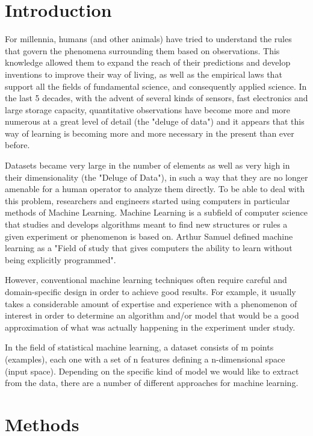 
\section{Introduction}
For millennia, humans (and other animals) have tried to understand the rules that govern the phenomena surrounding them based on observations. This knowledge allowed them to expand the reach of their predictions and develop inventions to improve their way of living, as well as the empirical laws that support all the fields of fundamental science, and consequently applied science. In the last 5 decades, with the advent of several kinds of sensors, fast electronics and large storage capacity, quantitative observations have become more and more numerous at a great level of detail (the "deluge of data") and it appears that this way of learning is becoming more and more necessary in the present than ever before.

Datasets became very large in the number of elements as well as very high in their dimensionality (the "Deluge of Data"), in such a way that they are no longer amenable for a human operator to analyze them directly. To be able to deal with this problem, researchers and engineers started using computers in particular methods of Machine Learning. Machine Learning is a subfield of computer science that studies and develops algorithms meant to find new structures or rules a given experiment or phenomenon is based on. Arthur Samuel defined machine learning as a "Field of study that gives computers the ability to learn without being explicitly programmed".

However, conventional machine learning techniques often require careful and domain-specific design in order to achieve good results. For example, it usually takes a considerable amount of expertise and experience with a phenomenon of interest in order to determine an algorithm and/or model that would be a good approximation of what was actually happening in the experiment under study.

In the field of statistical machine learning, a dataset consists of m points (examples), each one with a set of n features defining a n-dimensional space (input space). Depending on the specific kind of model we would like to extract from the data, there are a number of different approaches for machine learning.

\section{Methods}


